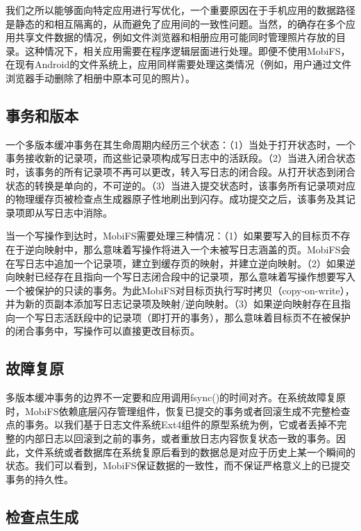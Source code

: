 我们之所以能够面向特定应用进行写优化，一个重要原因在于手机应用的数据路径是静态的和相互隔离的，从而避免了应用间的一致性问题。当然，的确存在多个应用共享文件数据的情况，例如文件浏览器和相册应用可能同时管理照片存放的目录。这种情况下，相关应用需要在程序逻辑层面进行处理。即便不使用MobiFS，在现有Android的文件系统上，应用同样需要处理这类情况（例如，用户通过文件浏览器手动删除了相册中原本可见的照片）。 

\subsection{事务和版本}

一个多版本缓冲事务在其生命周期内经历三个状态：（1）当处于打开状态时，一个事务接收新的记录项，而这些记录项构成写日志中的活跃段。（2）当进入闭合状态时，该事务的所有记录项不再可以更改，转入写日志的闭合段。从打开状态到闭合状态的转换是单向的，不可逆的。（3）当进入提交状态时，该事务所有记录项对应的物理缓存页被检查点生成器原子性地刷出到闪存。成功提交之后，该事务及其记录项即从写日志中消除。 
 
当一个写操作到达时，MobiFS需要处理三种情况：（1）如果要写入的目标页不存在于逆向映射中，那么意味着写操作将进入一个未被写日志涵盖的页。MobiFS会在写日志中追加一个记录项，建立到缓存页的映射，并建立逆向映射。（2）如果逆向映射已经存在且指向一个写日志闭合段中的记录项，那么意味着写操作想要写入一个被保护的只读的事务。为此MobiFS对目标页执行写时拷贝（copy-on-write），并为新的页副本添加写日志记录项及映射/逆向映射。（3）如果逆向映射存在且指向一个写日志活跃段中的记录项（即打开的事务），那么意味着目标页不在被保护的闭合事务中，写操作可以直接更改目标页。

\subsection{故障复原}

多版本缓冲事务的边界不一定要和应用调用fsync()的时间对齐。在系统故障复原时，MobiFS依赖底层闪存管理组件，恢复已提交的事务或者回滚生成不完整检查点的事务。以我们基于日志文件系统Ext4组件的原型系统为例，它或者丢掉不完整的内部日志以回滚到之前的事务，或者重放日志内容恢复状态一致的事务。因此，文件系统或者数据库在系统复原后看到的数据总是对应于历史上某一个瞬间的状态。我们可以看到，MobiFS保证数据的一致性，而不保证严格意义上的已提交事务的持久性。

\subsection{检查点生成}

